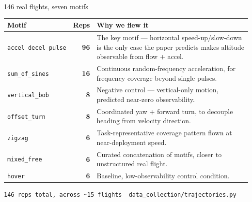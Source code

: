 \documentclass[aspectratio=169]{beamer}
\newcommand{\code}[1]{\textcolor{tealc}{\texttt{#1}}}
\newcommand{\stat}[1]{\textcolor{amber}{\textbf{#1}}}
\begin{document}
\begin{frame}{146 real flights, seven motifs}
  \scriptsize
  \setlength{\tabcolsep}{4pt}
  \begin{table}
    \begin{tabular}{@{}l r p{6.2cm}@{}}
      \toprule
      \textbf{Motif} & \textbf{Reps} & \textbf{Why we flew it} \\
      \midrule
      \code{accel\_decel\_pulse} & \stat{96} & The key motif --- horizontal speed-up/slow-down is the only case the paper predicts makes altitude observable from flow + accel. \\[0.15em]
      \code{sum\_of\_sines} & \stat{16} & Continuous random-frequency acceleration, for frequency coverage beyond single pulses. \\[0.15em]
      \code{vertical\_bob} & \stat{8} & Negative control --- vertical-only motion, predicted near-zero observability. \\[0.15em]
      \code{offset\_turn} & \stat{8} & Coordinated yaw + forward turn, to decouple heading from velocity direction. \\[0.15em]
      \code{zigzag} & \stat{6} & Task-representative coverage pattern flown at near-deployment speed. \\[0.15em]
      \code{mixed\_free} & \stat{6} & Curated concatenation of motifs, closer to unstructured real flight. \\[0.15em]
      \code{hover} & \stat{6} & Baseline, low-observability control condition. \\
      \bottomrule
    \end{tabular}
  \end{table}
  \vspace{0.15em}
  \footnotesize
  \textcolor{txtfaint}{\texttt{146 reps total, across \textasciitilde 15 flights \textperiodcentered\ data\_collection/trajectories.py}}
\end{frame}
\end{document}
